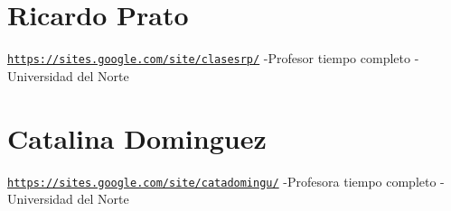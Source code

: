 \hypertarget{a00001_rapt}{}\section{Ricardo Prato}\label{a00001_rapt}
\href{https://sites.google.com/site/clasesrp/}{\tt https\-://sites.\-google.\-com/site/clasesrp/} -\/\-Profesor tiempo completo -\/\-Universidad del Norte\hypertarget{a00001_cdg}{}\section{Catalina Dominguez}\label{a00001_cdg}
\href{https://sites.google.com/site/catadomingu/}{\tt https\-://sites.\-google.\-com/site/catadomingu/} -\/\-Profesora tiempo completo -\/\-Universidad del Norte 